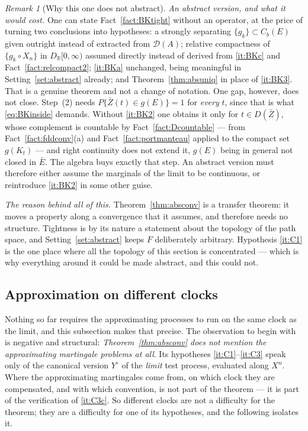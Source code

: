\documentclass[11pt,a4paper]{article}
\theoremstyle{plain}
\theoremstyle{definition}
\theoremstyle{remark}
\newtheorem{remark}[theorem]{Remark}
\newcommand{\R}{\mathbb{R}}
\newcommand{\Cb}{C_b}                          %
\newcommand{\dom}{\mathcal{D}}                 %
\begin{document}
\begin{remark}[Why this one does not abstract]
  \emph{An abstract version, and what it would cost.}  One can state
  Fact~\ref{fact:BKtight} without an operator, at the price of turning two
  conclusions into hypotheses: a strongly separating $\{g_k\} \subset \Cb(E)$
  given outright instead of extracted from $\dom(A)$; relative compactness of
  $\{g_k \circ X_n\}$ in $D_{\R}[0,\infty)$ assumed directly instead of derived
  from \ref{it:BKc} and Fact~\ref{fact:relcompact2}; \ref{it:BKa} unchanged, being
  meaningful in Setting~\ref{set:abstract} already; and
  Theorem~\ref{thm:absuniq} in place of \ref{it:BK3}.  That is a genuine theorem
  and not a change of notation.  One gap, however, does not close.  Step~(2) needs
  $P\{\bar Z(t) \in g(E)\} = 1$ for \emph{every} $t$, since that is what
  \eqref{eq:BKinside} demands.  Without \ref{it:BK2} one obtains it only for
  $t \in D(\bar Z)$, whose complement is countable by
  Fact~\ref{fact:Dcountable} --- from Fact~\ref{fact:fddconv}(a) and
  Fact~\ref{fact:portmanteau} applied to the compact set $g(K_t)$ --- and right
  continuity does not extend it, $g(E)$ being in general not closed in $\bar E$.
  The algebra buys exactly that step.  An abstract version must therefore either
  assume the marginals of the limit to be continuous, or reintroduce
  \ref{it:BK2} in some other guise.

  \emph{The reason behind all of this.}  Theorem~\ref{thm:absconv} is a transfer
  theorem: it moves a property along a convergence that it assumes, and therefore
  needs no structure.  Tightness is by its nature a statement about the topology
  of the path space, and Setting~\ref{set:abstract} keeps $F$ deliberately
  arbitrary.  Hypothesis \ref{it:C1} is the one place where all the topology of
  this section is concentrated --- which is why everything around it could be made
  abstract, and this could not.
\end{remark}

\subsection{Approximation on different clocks}
\label{ssec:diffclocks}

Nothing so far requires the approximating processes to run on the same clock as
the limit, and this subsection makes that precise.  The observation to begin with
is negative and structural: \emph{Theorem~\ref{thm:absconv} does not mention the
approximating martingale problems at all}.  Its hypotheses \ref{it:C1}--\ref{it:C3}
speak only of the canonical version $Y^\circ$ of the \emph{limit} test process,
evaluated along $X^n$.  Where the approximating martingales come from, on which
clock they are compensated, and with which convention, is not part of the theorem
--- it is part of the verification of \ref{it:C3c}.  So different clocks are not a
difficulty for the theorem; they are a difficulty for one of its hypotheses, and
the following isolates it.
\end{document}

